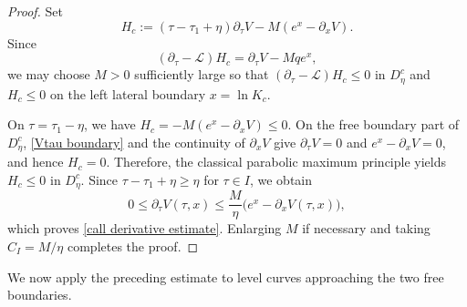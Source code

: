 \documentclass[11pt, a4paper, leqno]{amsart}
\numberwithin{equation}{section}
\theoremstyle{plain}
\theoremstyle{definition}
\theoremstyle{remark}
\def\leq{\leqslant}
\def\geq{\geqslant}
\begin{document}
{\begin{proof}
Set
\[
    H_c
    :=
    (\tau-\tau_1+\eta)\partial_\tau V
    -
    M(e^x-\partial_xV).
\]
Since
\[
    (\partial_\tau-\mathcal L)H_c
    =
    \partial_\tau V-Mqe^x,
\]
we may choose $M>0$ sufficiently large so that
$(\partial_\tau-\mathcal L)H_c\leq0$ in $D_\eta^c$ and
$H_c\leq0$ on the left lateral boundary $x=\ln K_c$.

On $\tau=\tau_1-\eta$, we have
$H_c=-M(e^x-\partial_xV)\leq0$.
On the free boundary part of $D_\eta^c$,
\eqref{Vtau boundary} and the continuity of $\partial_xV$ give
$\partial_\tau V=0$ and $e^x-\partial_xV=0$, and hence $H_c=0$.
Therefore, the classical parabolic maximum principle
\cite[Corollary 2.5]{LIE96} yields $H_c\leq0$ in $D_\eta^c$.
Since $\tau-\tau_1+\eta\geq\eta$ for $\tau\in I$, we obtain
\[
    0\leq\partial_\tau V(\tau,x)
    \leq
    \frac{M}{\eta}
    \bigl(e^x-\partial_xV(\tau,x)\bigr),
\]
which proves \eqref{call derivative estimate}.
Enlarging $M$ if necessary and taking $C_I=M/\eta$ completes the proof.
\end{proof}

We now apply the preceding estimate to level curves approaching the
two free boundaries.}
\end{document}

